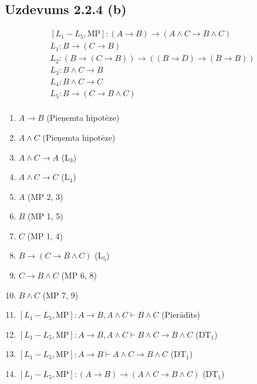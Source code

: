 \documentclass{article}
\begin{document}
\pagebreak

\subsection*{Uzdevums 2.2.4 (b)}

\[
    \begin{array}{l}
        [L_1 - L_5, \text{MP}]: (A \rightarrow B) \rightarrow (A \land C \rightarrow B \land C)              \\
        L_1: B \rightarrow (C \rightarrow B)                                                                 \\
        L_2: (B \rightarrow (C \rightarrow B)) \rightarrow ((B \rightarrow D) \rightarrow (B \rightarrow B)) \\
        L_3: B \land C \rightarrow B                                                                         \\
        L_4: B \land C \rightarrow C                                                                         \\
        L_5: B \rightarrow (C \rightarrow B \land C)                                                         \\
    \end{array}
\]

\begin{enumerate}
    \item $ A \rightarrow B $ \hfill (Pieņemta hipotēze)
    \item $ A \land C $ \hfill (Pieņemta hipotēze)
    \item $ A \land C \rightarrow A $ \hfill (L$_3$)
    \item $ A \land C \rightarrow C $ \hfill (L$_4$)
    \item $ A $ \hfill (MP 2, 3)
    \item $ B $ \hfill (MP 1, 5)
    \item $ C $ \hfill (MP 1, 4)
    \item $ B \rightarrow (C \rightarrow B \land C) $ \hfill (L$_5$)
    \item $ C \rightarrow B \land C $ \hfill (MP 6, 8)
    \item $ B \land C $ \hfill (MP 7, 9)
    \item $ [L_1 - L_5, \text{MP}]: A \rightarrow B, A \land C \vdash B \land C $ \hfill (Pierādīts)
    \item $ [L_1 - L_5, \text{MP}]: A \rightarrow B, A \land C \vdash B \land C \rightarrow B \land C $ \hfill (DT$_1$)
    \item $ [L_1 - L_5, \text{MP}]: A \rightarrow B \vdash A \land C \rightarrow B \land C $ \hfill (DT$_1$)
    \item $ [L_1 - L_5, \text{MP}]: (A \rightarrow B) \rightarrow (A \land C \rightarrow B \land C) $ \hfill (DT$_1$)
\end{enumerate}
\end{document}
